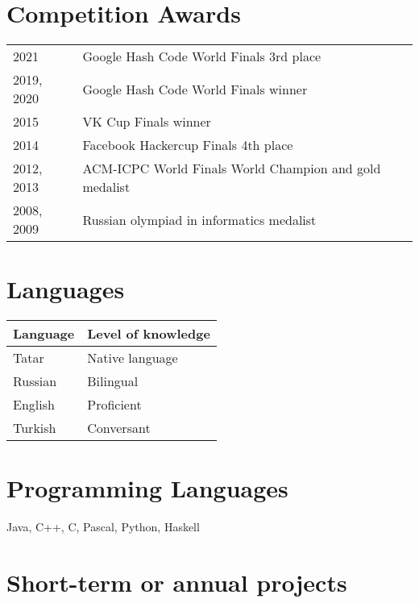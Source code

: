 \documentclass[11pt,a4paper,oneside]{article}
\begin{document}
\section{Competition Awards}
\begin{tabular}{l|l}
    2021 & Google Hash Code World Finals 3rd place \\
    2019, 2020 & Google Hash Code World Finals winner \\
    2015 & VK Cup Finals winner \\
    2014 & Facebook Hackercup Finals 4th place \\
    2012, 2013 & ACM-ICPC World Finals World Champion and gold medalist \\
    2008, 2009 & Russian olympiad in informatics medalist \\
\end{tabular}

\vspace{0.5cm}

\begin{multicols}{2}

\section{Languages}

\begin{center}  
    \begin{tabular}{l|l}
        Language&Level of knowledge \\
        \hline
        Tatar&Native language \\
        Russian&Bilingual \\ 
        English&Proficient \\
        Turkish&Conversant \\
    \end{tabular}
\end{center}


\section{Programming Languages}
    Java, C++, C, Pascal, Python, Haskell

\end{multicols}

\section{Short-term or annual projects}
\end{document}
